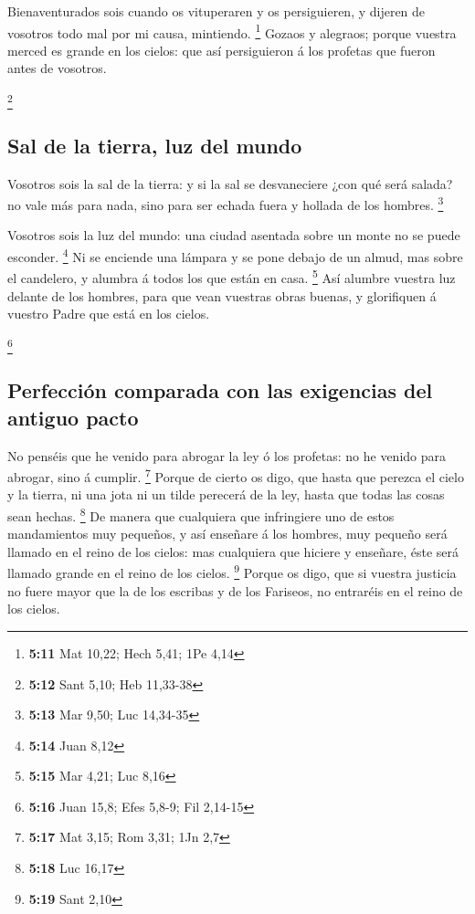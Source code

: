  Bienaventurados sois cuando os vituperaren y os
persiguieren, y dijeren de vosotros todo mal por mi causa, mintiendo.
\footnote{\textbf{5:11} Mat 10,22; Hech 5,41; 1Pe 4,14} 
Gozaos y alegraos; porque vuestra merced es grande en los cielos: que
así persiguieron á los profetas que fueron antes de vosotros.

\footnote{\textbf{5:12} Sant 5,10; Heb 11,33-38}

\hypertarget{sal-de-la-tierra-luz-del-mundo}{%
\subsection{Sal de la tierra, luz del
mundo}\label{sal-de-la-tierra-luz-del-mundo}}

 Vosotros sois la sal de la tierra: y si la sal se
desvaneciere ¿con qué será salada? no vale más para nada, sino para ser
echada fuera y hollada de los hombres. \footnote{\textbf{5:13} Mar 9,50;
  Luc 14,34-35}

 Vosotros sois la luz del mundo: una ciudad asentada sobre
un monte no se puede esconder. \footnote{\textbf{5:14} Juan 8,12}
 Ni se enciende una lámpara y se pone debajo de un almud,
mas sobre el candelero, y alumbra á todos los que están en casa.
\footnote{\textbf{5:15} Mar 4,21; Luc 8,16}  Así alumbre
vuestra luz delante de los hombres, para que vean vuestras obras buenas,
y glorifiquen á vuestro Padre que está en los cielos.

\footnote{\textbf{5:16} Juan 15,8; Efes 5,8-9; Fil 2,14-15}

\hypertarget{perfecciuxf3n-comparada-con-las-exigencias-del-antiguo-pacto}{%
\subsection{Perfección comparada con las exigencias del antiguo
pacto}\label{perfecciuxf3n-comparada-con-las-exigencias-del-antiguo-pacto}}

 No penséis que he venido para abrogar la ley ó los
profetas: no he venido para abrogar, sino á cumplir. \footnote{\textbf{5:17}
  Mat 3,15; Rom 3,31; 1Jn 2,7}  Porque de cierto os digo,
que hasta que perezca el cielo y la tierra, ni una jota ni un tilde
perecerá de la ley, hasta que todas las cosas sean hechas. \footnote{\textbf{5:18}
  Luc 16,17}  De manera que cualquiera que infringiere uno
de estos mandamientos muy pequeños, y así enseñare á los hombres, muy
pequeño será llamado en el reino de los cielos: mas cualquiera que
hiciere y enseñare, éste será llamado grande en el reino de los cielos.
\footnote{\textbf{5:19} Sant 2,10}  Porque os digo, que si
vuestra justicia no fuere mayor que la de los escribas y de los
Fariseos, no entraréis en el reino de los cielos.

